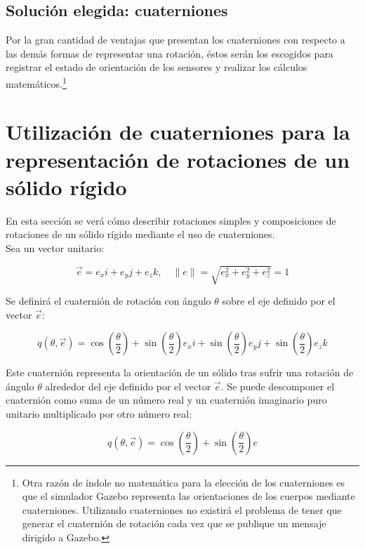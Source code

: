\documentclass[12pt, a4paper]{report}
\begin{document}
\subsection{Solución elegida: cuaterniones}

Por la gran cantidad de ventajas que presentan los cuaterniones con respecto a las demás formas de representar una rotación, éstos serán los escogidos para registrar el estado de orientación de los sensores y realizar los cálculos matemáticos.\footnote{Otra razón de índole no matemática para la elección de los cuaterniones es que el simulador Gazebo representa las orientaciones de los cuerpos mediante cuaterniones. Utilizando cuaterniones no existirá el problema de tener que generar el cuaternión de rotación cada vez que se publique un mensaje dirigido a Gazebo.}

\section{Utilización de cuaterniones para la representación de rotaciones de un sólido rígido}

En esta sección se verá cómo describir rotaciones simples y composiciones de rotaciones de un sólido rígido mediante el uso de cuaterniones. \\

Sea un vector unitario:

\begin{equation}
\vec{e} = e_x i + e_y j + e_z k, \quad \|e\| = \sqrt{e_x^2 + e_y^2 + e_z^2} = 1
\end{equation}


Se definirá el cuaternión de rotación con ángulo $\theta$ sobre el eje definido por el vector $\vec{e}$:

\begin{equation}
q(\theta, \vec{e}) = \cos \left(\frac{\theta}{2}\right) + \sin \left(\frac{\theta}{2}\right) e_x i + \sin \left(\frac{\theta}{2}\right) e_y j + \sin \left(\frac{\theta}{2}\right) e_z k 
\end{equation}

Este cuaternión representa la orientación de un sólido tras sufrir una rotación de ángulo $\theta$ alrededor del eje definido por el vector $\vec{e}$. Se puede descomponer el cuaternión como suma de un número real y un cuaternión imaginario puro unitario multiplicado por otro número real:

\begin{equation}
q( \theta , \vec{e}) = \cos \left(\frac{\theta}{2}\right) + \sin \left(\frac{\theta}{2}\right) e  
\end{equation}
\end{document}
